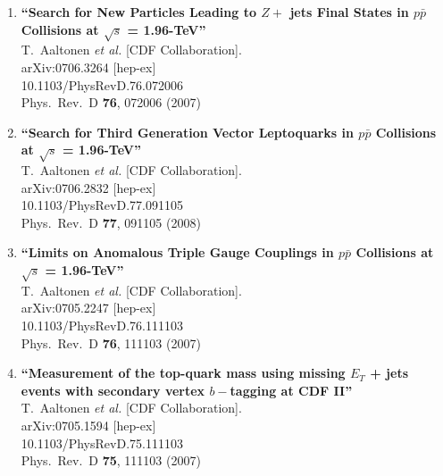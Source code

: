 \documentclass{article}
\begin{document}
\begin{enumerate}
\item%
{\bf ``Search for New Particles Leading to $Z +$ jets Final States in $p \bar{p}$ Collisions at $\sqrt{s}$ = 1.96-TeV''}
  \\{}T.~Aaltonen {\it et al.}  [CDF Collaboration].
  \\{}arXiv:0706.3264 [hep-ex]
    \\{}10.1103/PhysRevD.76.072006
\\{}Phys.\ Rev.\ D {\bf 76}, 072006 (2007) %


\item%
{\bf ``Search for Third Generation Vector Leptoquarks in $p \bar{p}$ Collisions at $\sqrt{s}$ = 1.96-TeV''}
  \\{}T.~Aaltonen {\it et al.}  [CDF Collaboration].
  \\{}arXiv:0706.2832 [hep-ex]
    \\{}10.1103/PhysRevD.77.091105
\\{}Phys.\ Rev.\ D {\bf 77}, 091105 (2008) %


\item%
{\bf ``Limits on Anomalous Triple Gauge Couplings in $p \bar{p}$ Collisions at $\sqrt{s}$ = 1.96-TeV''}
  \\{}T.~Aaltonen {\it et al.}  [CDF Collaboration].
  \\{}arXiv:0705.2247 [hep-ex]
    \\{}10.1103/PhysRevD.76.111103
\\{}Phys.\ Rev.\ D {\bf 76}, 111103 (2007) %


\item%
{\bf ``Measurement of the top-quark mass using missing $E_T$ + jets events with secondary vertex $b-$tagging at CDF II''}
  \\{}T.~Aaltonen {\it et al.}  [CDF Collaboration].
  \\{}arXiv:0705.1594 [hep-ex]
    \\{}10.1103/PhysRevD.75.111103
\\{}Phys.\ Rev.\ D {\bf 75}, 111103 (2007) %



\end{enumerate}
\end{document}
